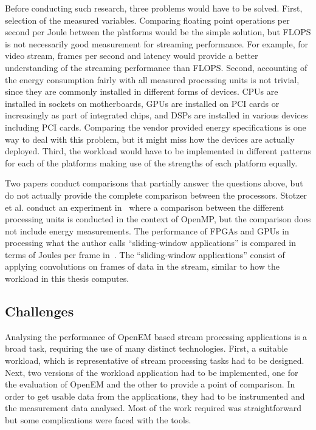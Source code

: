 Before conducting such research, three problems would have to be solved. First, selection of the measured variables. Comparing floating point operations per second per Joule between the platforms would be the simple solution, but FLOPS is not necessarily good measurement for streaming performance. For example, for video stream, frames per second and latency would provide a better understanding of the streaming performance than FLOPS. Second, accounting of the energy consumption fairly with all measured processing units is not trivial, since they are commonly installed in different forms of devices. CPUs are installed in sockets on motherboards, GPUs are installed on PCI cards or increasingly as part of integrated chips, and DSPs are installed in various devices including PCI cards. Comparing the vendor provided energy specifications is one way to deal with this problem, but it might miss how the devices are actually deployed. Third, the workload would have to be implemented in different patterns for each of the platforms making use of the strengths of each platform equally.

Two papers conduct comparisons that partially answer the questions above, but do not actually provide the complete comparison between the processors. Stotzer et al. conduct an experiment in~\cite{stotzer2013openmp} where a comparison between the different processing units is conducted in the context of OpenMP, but the comparison does not include energy measurements. The performance of FPGAs and GPUs in processing what the author calls ``sliding-window applications'' is compared in terms of Joules per frame in~\cite{fowers2012performance}. The ``sliding-window applications'' consist of applying convolutions on frames of data in the stream, similar to how the workload in this thesis computes.

\subsection{Challenges}
\label{subsec:challenges}
Analysing the performance of OpenEM based stream processing applications is a broad task, requiring the use of many distinct technologies. First, a suitable workload, which is representative of stream processing tasks had to be designed. Next, two versions of the workload application had to be implemented, one for the evaluation of OpenEM and the other to provide a point of comparison. In order to get usable data from the applications, they had to be instrumented and the measurement data analysed. Most of the work required was straightforward but some complications were faced with the tools.

